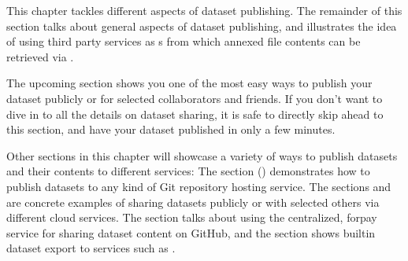 \sphinxAtStartPar
This chapter tackles different aspects of dataset publishing.
The remainder of this section talks about general aspects of dataset publishing, and
illustrates the idea of using third party services as {\hyperref[\detokenize{glossary:term-special-remote}]{}}s from
which annexed file contents can be retrieved via .

\sphinxAtStartPar
The upcoming section  shows you one of the most easy ways to publish your
dataset publicly or for selected collaborators and friends.
If you don’t want to dive in to all the details on dataset sharing, it is safe to
directly skip ahead to this section, and have your dataset published in only a few minutes.

\sphinxAtStartPar
Other sections in this chapter will showcase a variety of ways to publish datasets
and their contents to different services:
The section {\hyperref[\detokenize{basics/101-139-hostingservices:share-hostingservice}]{}} () demonstrates how to publish datasets to any
kind of Git repository hosting service.
The sections  and  are concrete examples of sharing datasets
publicly or with selected others via different cloud services.
The section  talks about using the centralized, for\sphinxhyphen{}pay service
 for sharing dataset content on GitHub, and the
section  shows built\sphinxhyphen{}in dataset export to services such as
.


